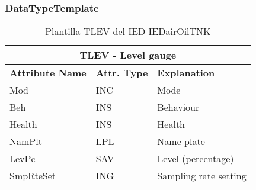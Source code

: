     \subsubsection{DataTypeTemplate}
    \begin{table}[H]
    \begin{center}
    \begin{tabular}{|l|l|p{8.5cm}|}
            \hline
            \multicolumn{3}{|c|}{\cellcolor[gray]{0.8} \textbf{ TLEV}  - Level gauge} \\
            \hline
            \textbf{Attribute Name} & \textbf{Attr. Type} & \textbf{Explanation} \\
            \hline 
            Mod & INC & Mode \\
            \hline
            Beh & INS & Behaviour \\
            \hline
            Health & INS & Health \\
            \hline
            NamPlt & LPL & Name plate \\
            \hline
            LevPc & SAV & Level (percentage) \\
            \hline
            SmpRteSet & ING & Sampling rate setting \\
            \hline
    \end{tabular}
    \caption{Plantilla TLEV del IED IEDairOilTNK}
    \label{table:lnTypeTLEV_gauge}
    \end{center}
    \end{table}
    
    
    